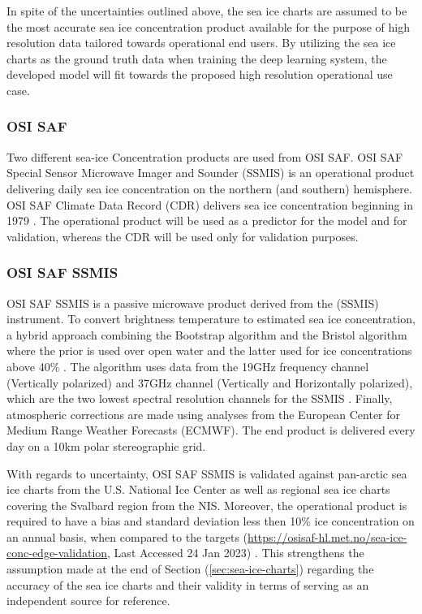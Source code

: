 \documentclass[../main/thesis.tex]{subfiles}
\begin{document}
In spite of the uncertainties outlined above, the sea ice charts are assumed to be the most accurate sea ice concentration product available for the purpose of high resolution data tailored towards operational end users. By utilizing the sea ice charts as the ground truth data when training the deep learning system, the developed model will fit towards the proposed high resolution operational use case.

\subsubsection{OSI SAF}
\label{sec:osisaf}
Two different sea-ice Concentration products are used from OSI SAF. OSI SAF Special Sensor Microwave Imager and Sounder (SSMIS) is an operational product delivering daily sea ice concentration on the northern (and southern) hemisphere. OSI SAF Climate Data Record (CDR) \citep{Soerensen2021} delivers sea ice concentration beginning in 1979 \citep{Lavergne2019}. The operational product will be used as a predictor for the model and for validation, whereas the CDR will be used only for validation purposes.

\subsubsection{OSI SAF SSMIS}

OSI SAF SSMIS is a passive microwave product derived from the (SSMIS) instrument. To convert brightness temperature to estimated sea ice concentration, a hybrid approach combining the Bootstrap algorithm \citep{Comiso1997} and the Bristol algorithm \citep{Smith1996} where the prior is used over open water and the latter used for ice concentrations above 40\% \citep{Tonboe2017}. The algorithm uses data from the 19GHz frequency channel (Vertically polarized) and 37GHz channel (Vertically and Horizontally polarized), which are the two lowest spectral resolution channels for the SSMIS \cite{Tonboe2017}. Finally, atmospheric corrections are made using analyses from the European Center for Medium Range Weather Forecasts (ECMWF). The end product is delivered every day on a 10km polar stereographic grid.

With regards to uncertainty, OSI SAF SSMIS is validated against pan-arctic sea ice charts from the U.S. National Ice Center as well as regional sea ice charts covering the Svalbard region from the NIS. Moreover, the operational product is required to have a bias and standard deviation less then 10\% ice concentration on an annual basis, when compared to the targets (\url{https://osisaf-hl.met.no/sea-ice-conc-edge-validation}, Last Accessed 24 Jan 2023) \citep{Lavelle2017}. This strengthens the assumption made at the end of Section (\ref{sec:sea-ice-charts}) regarding the accuracy of the sea ice charts and their validity in terms of serving as an independent source for reference.
\end{document}
